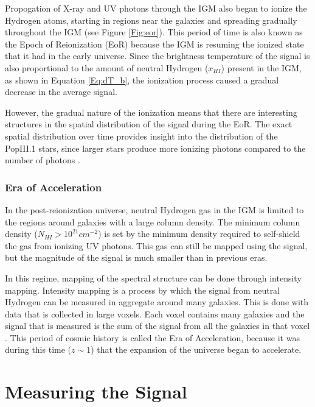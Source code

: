 Propogation of X-ray and UV photons through the IGM also began to ionize the Hydrogen atoms, starting in regions near the galaxies and spreading gradually throughout the IGM (see Figure \ref{Fig:eor}). This period of time is also known as the Epoch of Reionization (EoR) because the IGM is resuming the ionized state that it had in the early universe. Since the brightness temperature of the \cm signal is also proportional to the amount of neutral Hydrogen ($x_{HI}$) present in the IGM, as shown in Equation \ref{Eq:dT_b}, the ionization process caused a gradual decrease in the average \cm signal. 

However, the gradual nature of the ionization means that there are interesting structures in the spatial distribution of the \cm signal during the EoR. The exact spatial distribution over time provides insight into the distribution of the PopIII.1 stars, since larger stars produce more ionizing photons compared to the number of \lya  photons \cite{furlanetto_2006}. 

\subsubsection{Era of Acceleration}

In the post-reionization universe, neutral Hydrogen gas in the IGM is limited to the regions around galaxies with a large column density. The minimum column density ($N_{HI}>10^{21} cm^{-2}$) is set by the minimum density required to self-shield the gas from ionizing UV photons. This gas can still be mapped using the \cm signal, but the magnitude of the signal is much smaller than in previous eras. 

In this regime, mapping of the spectral structure can be done through intensity mapping. Intensity mapping is a process by which the signal from neutral Hydrogen can be measured in aggregate around many galaxies. This is done with data that is collected in large voxels. Each voxel contains many galaxies and the \cm signal that is measured is the sum of the \cm signal from all the galaxies in that voxel \cite{masui_2012}. This period of cosmic history is called the Era of Acceleration, because it was during this time ($z \sim 1$) that the expansion of the universe began to accelerate. 

\section{Measuring the \cm Signal}

